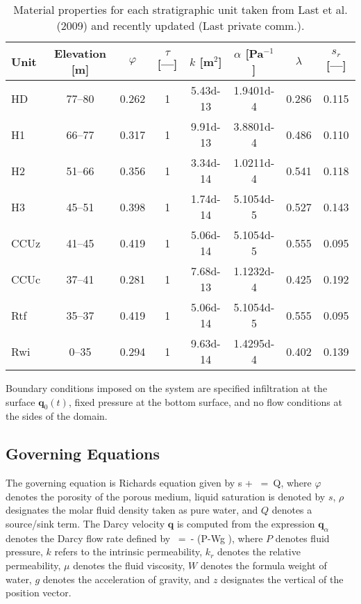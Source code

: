 \documentclass[12pt]{article}
\def\EQ#1\EN{\begin{equation}#1\end{equation}}
\newcommand{\eq}{\ =\ }
\newcommand{\p}{{\partial}}
\renewcommand{\a}{{\alpha}}
\newcommand{\bnabla}{\boldsymbol{\nabla}}
\newcommand{\bq}{\boldsymbol{q}}
\newcommand{\bz}{\boldsymbol{z}}
\begin{document}
\begin{table}[h]\centering
\caption{Material properties for each stratigraphic unit taken from Last et al. (2009) and recently updated (Last private comm.).}\label{tstrata}
\vspace{3mm}
\begin{tabular}{lccccccc}
\toprule
Unit & Elevation [m] & $\varphi$ & $\tau$ [---] & $k$ [m$^2$] & $\a$ [Pa$^{-1}$] & $\lambda$ & $s_r$ [---] \\
\midrule
HD   & 77--80 & 0.262 & 1 & 5.43d-13 & 1.9401d-4 & 0.286 & 0.115 \\ 
H1   & 66--77 & 0.317 & 1 & 9.91d-13 & 3.8801d-4 & 0.486 & 0.110\\
H2   & 51--66 & 0.356 & 1 & 3.34d-14 & 1.0211d-4 & 0.541 & 0.118\\
H3   & 45--51 & 0.398 & 1 & 1.74d-14 & 5.1054d-5 & 0.527 & 0.143\\
CCUz & 41--45 & 0.419 & 1 & 5.06d-14 & 5.1054d-5 & 0.555 & 0.095\\
CCUc & 37--41 & 0.281 & 1 & 7.68d-13 & 1.1232d-4 & 0.425 & 0.192\\
Rtf  & 35--37 & 0.419 & 1 & 5.06d-14 & 5.1054d-5 & 0.555 & 0.095\\
Rwi  & 0--35 & 0.294 & 1 & 9.63d-14 & 1.4295d-4 & 0.402 & 0.139\\
\bottomrule
\end{tabular}
\end{table}

Boundary conditions imposed on the system are specified infiltration at the surface $\bq_0(t)$, fixed pressure at the bottom surface, and no flow conditions at the sides of the domain.

\subsection{Governing Equations}

The governing equation is Richards equation given by
\EQ
\frac{\p}{\p t} \varphi s \rho + \bnabla\cdot\bq\rho \eq Q,
\EN
where $\varphi$ denotes the porosity of the porous medium, liquid saturation is denoted by $s$, $\rho$ designates the molar fluid density taken as pure water, and $Q$ denotes a source/sink term. The Darcy velocity $\bq$ is computed from the expression
$\bq_\a$ denotes the Darcy flow rate defined by
\EQ
\bq \eq - \bnabla \big(P-W\rho g \bz\big),
\EN
where $P$ denotes fluid pressure, $k$ refers to the intrinsic permeability, $k_r$ denotes the relative permeability, $\mu$ denotes the fluid viscosity, $W$ denotes the formula weight of water, $g$ denotes the acceleration of gravity, and $z$ designates the vertical of the position vector. 
\end{document}

